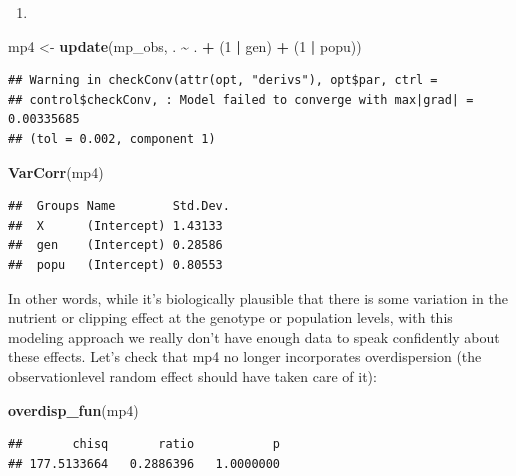 \documentclass[
  12pt,
]{book}
\newenvironment{Shaded}{\begin{snugshade}}{\end{snugshade}}
\newcommand{\DecValTok}[1]{\textcolor[rgb]{0.00,0.00,0.81}{#1}}
\newcommand{\KeywordTok}[1]{\textcolor[rgb]{0.13,0.29,0.53}{\textbf{#1}}}
\newcommand{\NormalTok}[1]{#1}
\newcommand{\OperatorTok}[1]{\textcolor[rgb]{0.81,0.36,0.00}{\textbf{#1}}}
\newcommand{\StringTok}[1]{\textcolor[rgb]{0.31,0.60,0.02}{#1}}
\providecommand{\tightlist}{%
  \setlength{\itemsep}{0pt}\setlength{\parskip}{0pt}}
\begin{document}
\begin{enumerate}
\def\labelenumi{\arabic{enumi}.}
\setcounter{enumi}{2}
\tightlist
\item
\end{enumerate}

\begin{Shaded}
\begin{Highlighting}[]
\NormalTok{mp4 \textless{}{-}}\StringTok{ }\KeywordTok{update}\NormalTok{(mp\_obs, . }\OperatorTok{\textasciitilde{}}\StringTok{ }\NormalTok{. }\OperatorTok{+}\StringTok{ }\NormalTok{(}\DecValTok{1} \OperatorTok{|}\StringTok{ }\NormalTok{gen) }\OperatorTok{+}\StringTok{ }\NormalTok{(}\DecValTok{1} \OperatorTok{|}\StringTok{ }\NormalTok{popu))}
\end{Highlighting}
\end{Shaded}

\begin{verbatim}
## Warning in checkConv(attr(opt, "derivs"), opt$par, ctrl =
## control$checkConv, : Model failed to converge with max|grad| = 0.00335685
## (tol = 0.002, component 1)
\end{verbatim}

\begin{Shaded}
\begin{Highlighting}[]
\KeywordTok{VarCorr}\NormalTok{(mp4)}
\end{Highlighting}
\end{Shaded}

\begin{verbatim}
##  Groups Name        Std.Dev.
##  X      (Intercept) 1.43133 
##  gen    (Intercept) 0.28586 
##  popu   (Intercept) 0.80553
\end{verbatim}

In other words, while it's biologically plausible that there is some variation in the nutrient or clipping effect at the genotype or population levels, with this modeling approach we really don't have enough data to speak confidently about these effects.
Let's check that mp4 no longer incorporates overdispersion (the observationlevel random effect should have taken care of it):

\begin{Shaded}
\begin{Highlighting}[]
\KeywordTok{overdisp\_fun}\NormalTok{(mp4)}
\end{Highlighting}
\end{Shaded}

\begin{verbatim}
##       chisq       ratio           p 
## 177.5133664   0.2886396   1.0000000
\end{verbatim}
\end{document}
